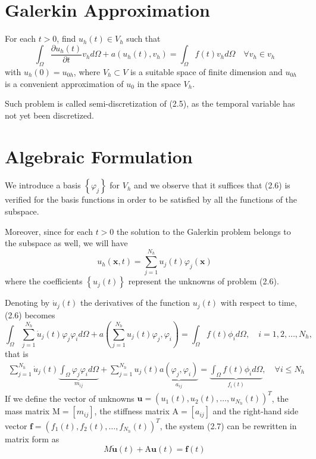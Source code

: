 \documentclass[11pt]{book}
\begin{document}
\section{Galerkin Approximation}
For each $t>0$, find $u_{h}(t) \in V_{h}$ such that
\begin{equation}
\int_{\Omega} \frac{\partial u_{h}(t)}{\partial t} v_{h} d \Omega+a\left(u_{h}(t), v_{h}\right)=\int_{\Omega} f(t) v_{h} d \Omega \quad \forall v_{h} \in v_{h}
\end{equation}
with $u_{h}(0)=u_{0 h}$, where $V_{h} \subset V$ is a suitable space of finite dimension and $u_{0 h}$ is a convenient approximation of $u_{0}$ in the space $V_{h}$.

Such problem is called semi-discretization of (2.5), as the temporal variable has not yet been discretized.

\section{Algebraic Formulation}
We introduce a basis $\left\{\varphi_{j}\right\}$ for $V_{h}$ and we observe that it suffices that (2.6) is verified for the basis functions in order to be satisfied by all the functions of the subspace.

Moreover, since for each $t>0$ the solution to the Galerkin problem belongs to the subspace as well, we will have
\begin{equation}
u_{h}(\mathbf{x}, t)=\sum_{j=1}^{N_{h}} u_{j}(t) \varphi_{j}(\mathbf{x})
\end{equation}
where the coefficients $\left\{u_{j}(t)\right\}$ represent the unknowns of problem (2.6).

Denoting by $\dot{u}_{j}(t)$ the derivatives of the function $u_{j}(t)$ with respect to time, (2.6) becomes
\begin{equation*}
\int_{\Omega} \sum_{j=1}^{N_{h}} \dot{u}_{j}(t) \varphi_{j} \varphi_{i} d \Omega+a\left(\sum_{j=1}^{N_{h}} u_{j}(t) \varphi_{j}, \varphi_{i}\right)=\int_{\Omega} f(t) \phi_{i} d \Omega, \quad  i=1,2, \ldots, N_{h},
\end{equation*}
that is
\begin{equation}
\begin{array}{r}
\sum_{j=1}^{N_{h}} \dot{u}_{j}(t) \underbrace{\int_{\Omega} \varphi_{j} \varphi_{i} d \Omega}_{m_{i j}}+\sum_{j=1}^{N_{h}} u_{j}(t) \underbrace{a\left(\varphi_{j}, \varphi_{i}\right)}_{a_{i j}}=\underbrace{\int_{\Omega} f(t) \phi_{i} d \Omega}_{f_{i}(t)}, \quad \forall i \leq   N_{h}
\end{array}
\end{equation}
If we define the vector of unknowns $\mathbf{u}=\left(u_{1}(t), u_{2}(t), \ldots, u_{N_{h}}(t)\right)^{T}$, the mass matrix $\mathrm{M}=\left[m_{i j}\right]$, the stiffness matrix $\mathrm{A}=\left[a_{i j}\right]$ and the right-hand side vector $\mathbf{f}=\left(f_{1}(t), f_{2}(t), \ldots, f_{N_{h}}(t)\right)^{T}$, the system (2.7) can be rewritten in matrix form as
\begin{equation*}
M \dot{\mathbf{u}}(t)+\mathrm{A} \mathbf{u}(t)=\mathbf{f}(t)
\end{equation*}
\end{document}
